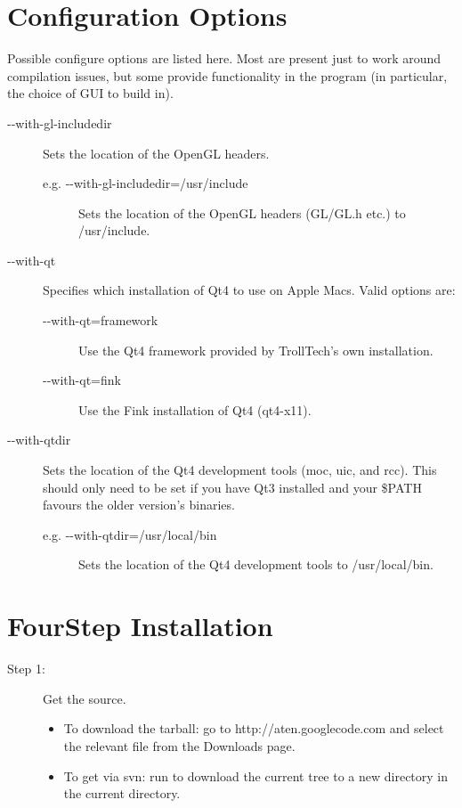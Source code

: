 \section{Configuration Options}

Possible {\sffamily configure} options are listed here. Most are present just to work around compilation issues, but some provide functionality in the program (in particular, the choice of GUI to build in).

\begin{description}

	\item[{-}{-}with-gl-includedir]
		Sets the location of the OpenGL headers.
	\begin{description}
		\item[e.g. {-}{-}with-gl-includedir=/usr/include]
			Sets the location of the OpenGL headers (GL/GL.h etc.) to /usr/include.
	\end{description}

	\item[{-}{-}with-qt] Specifies which installation of Qt4 to use on Apple Macs. Valid options are:
	\begin{description}
		\item[{-}{-}with-qt=framework]
			Use the Qt4 framework provided by TrollTech's own installation.
		\item[{-}{-}with-qt=fink]
			Use the Fink installation of Qt4 (qt4-x11).
	\end{description}

	\item[{-}{-}with-qtdir] Sets the location of the Qt4 development tools ({\sffamily moc}, {\sffamily uic}, and {\sffamily rcc}). This should only need to be set if you have Qt3 installed and your \$PATH favours the older version's binaries.
	\begin{description}
		\item[e.g. {-}{-}with-qtdir=/usr/local/bin]
			Sets the location of the Qt4 development tools to /usr/local/bin.
	\end{description}

\end{description}


\section{Four\textonehalf Step Installation}

\begin{description}
	\item[Step 1:\its] Get the source.
	\begin{itemize}
		\item To download the tarball: go to http://aten.googlecode.com and select the relevant file from the Downloads page.
		\item To get via {\sffamily svn}: run  to download the current tree to a new directory  in the current directory.
	\end{itemize}
\end{description}


